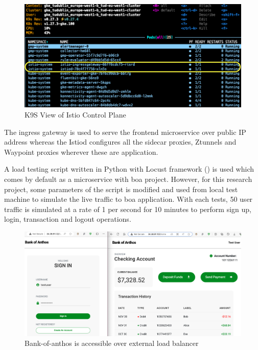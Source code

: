 \begin{figure}[ht!]
    \centering
    \includegraphics[width=1.0\linewidth]{resources/istio-std-installed.png}
    \caption{K9S View of Istio Control Plane}
    \label{method:istioStdInstalledView}
\end{figure}

The ingress gateway is used to serve the frontend microservice over public IP address whereas the Istiod configures all the sidecar proxies, Ztunnels and Waypoint proxies wherever these are application. 

A load testing script written in Python with Locust framework (\cite{locustDoc}) is used which comes by default as a microservice with \acrshort{boa} project. However, for this research project, some parameters of the script is modified and used from local test machine to simulate the live traffic to \acrshort{boa} application. With each tests, 50 user traffic is simulated at a rate of 1 per second for 10 minutes to perform sign up, login, transaction and logout operations.

\begin{figure}[ht!]
  \centering
  \includegraphics[width=1.0\linewidth]{resources/boa-view.png}
  \caption{Bank-of-anthos is accessible over external load balancer}
  \label{method:boaWebView}
\end{figure}

